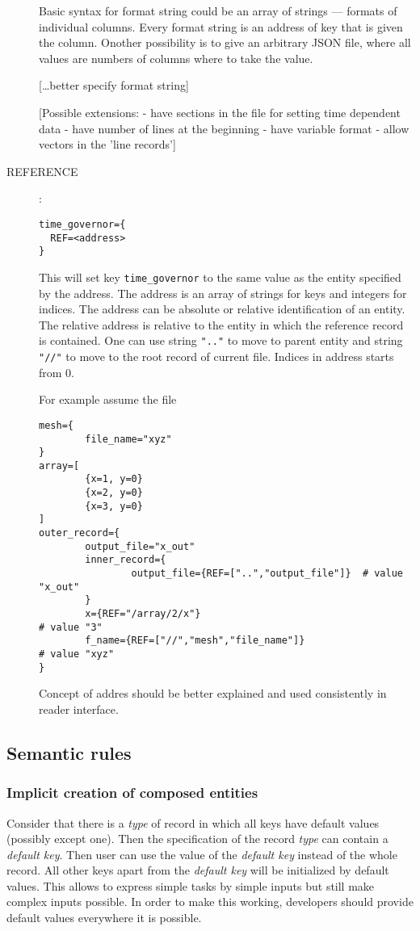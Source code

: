 \begin{description}
Basic syntax for format string could be an array of strings --- formats of individual columns.
Every format string is an address of key that is given the column. Onother possibility is to give an arbitrary 
JSON file, where all values are numbers of columns where to take the value.

[\dots better specify format string]


[Possible extensions:
- have sections in the file for setting time dependent data
- have number of lines at the beginning
- have variable format
- allow vectors in the 'line records']

\item[REFERENCE]:\\
\begin{verbatim}
time_governor={
  REF=<address>
}
\end{verbatim}
This will set key \verb'time_governor' to the same value as the entity specified by the address.
The address is an array of strings for keys and integers for indices.
The address can be absolute or relative identification of an entity. The relative address is relative to the entity in which the reference record is contained.
One can use string \verb'".."' to move to parent entity and string \verb'"//"' to move to the root record of current file.
Indices in address starts from 0.

For example assume the file
\begin{verbatim}
mesh={
        file_name="xyz"
}
array=[
        {x=1, y=0}       
        {x=2, y=0}
        {x=3, y=0}
]               
outer_record={
        output_file="x_out"
        inner_record={
                output_file={REF=["..","output_file"]}  # value "x_out"
        }
        x={REF="/array/2/x"}                                    # value "3"
        f_name={REF=["//","mesh","file_name"]}                  # value "xyz"
}       
\end{verbatim}

Concept of addres should be better explained and used consistently in reader interface.
\end{description}

\subsection{Semantic rules}

\subsubsection{Implicit creation of composed entities}
Consider that there is a {\it type} of record in which all keys have default values (possibly except one). Then the specification
of the record {\it type} can contain a {\it default key}. Then user can use the value of the {\it default key} instead of the whole record.
All other keys apart from the {\it default key} will be initialized by default values. 
This allows to express simple tasks by simple inputs but still make complex inputs possible. 
In order to make this working, developers should provide default values everywhere it is possible.
 
